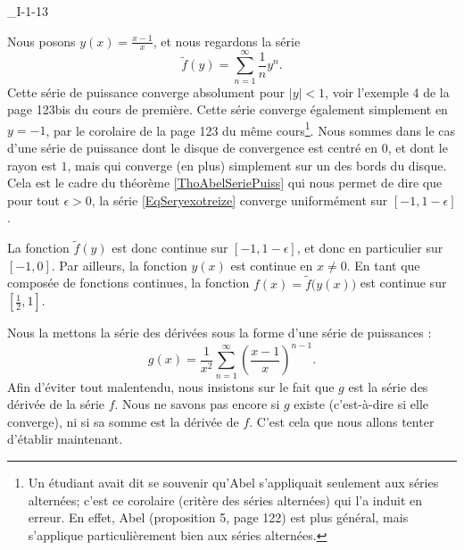 

\begin{corrige}{_I-1-13}

Nous posons $y(x)=\frac{ x-1 }{ x }$, et nous regardons la série
\begin{equation}		\label{EqSeryexotreize}
	\tilde f(y)=\sum_{n=1}^{\infty}\frac{1}{ n }y^n.
\end{equation}
Cette série de puissance converge absolument pour $| y |<1$, voir l'exemple 4 de la page 123bis du cours de première. Cette série converge également simplement en $y=-1$, par le corolaire de la page 123 du même cours\footnote{Un étudiant avait dit se souvenir qu'Abel s'appliquait seulement aux séries alternées; c'est ce corolaire (critère des séries alternées) qui l'a induit en erreur. En effet, Abel (proposition 5, page 122) est plus général, mais s'applique particulièrement bien aux séries alternées.}. Nous sommes dans le cas d'une série de puissance dont le disque de convergence est centré en $0$, et dont le rayon est $1$, mais qui converge (en plus) simplement sur un des bords du disque. Cela est le cadre du théorème \ref{ThoAbelSeriePuiss} qui nous permet de dire que pour tout $\epsilon>0$, la série \eqref{EqSeryexotreize} converge uniformément sur $[-1,1-\epsilon]$.

La fonction $\tilde f(y)$ est donc continue sur $[-1,1-\epsilon]$, et donc en particulier sur $[-1,0]$. Par ailleurs, la fonction $y(x)$ est continue en $x\neq 0$. En tant que composée de fonctions continues, la fonction $f(x)=\tilde f\big( y(x) \big)$ est continue sur $[\frac{ 1 }{2},1]$.

Nous la mettons la série des dérivées sous la forme d'une série de puissances :
\begin{equation}		\label{EqSerieDerrTreize}
	g(x)=\frac{1}{ x^2 }\sum_{n=1}^{\infty} \left( \frac{ x-1 }{ x } \right)^{n-1}.
\end{equation}
Afin d'éviter tout malentendu, nous insistons sur le fait que $g$ est la série des dérivée de la série $f$. Nous ne savons pas encore si $g$ existe (c'est-à-dire si elle converge), ni si sa somme est la dérivée de $f$. C'est cela que nous allons tenter d'établir maintenant.


\end{corrige}
